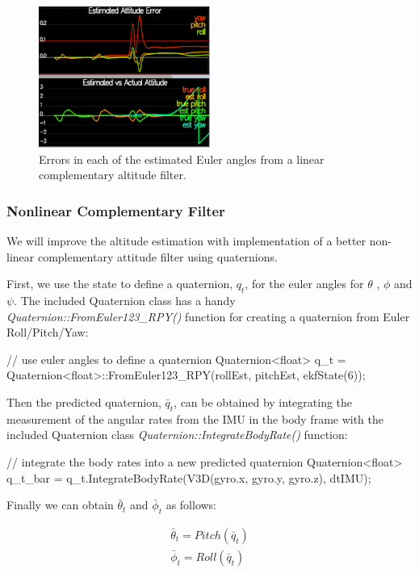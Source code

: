 \documentclass[letterpaper]{article}
\begin{document}
\begin{figure}[ht]
\centering
\includegraphics[width=0.5\textwidth]{./images/scenario7_1.png}
\caption{\label{fig:linear_comp_filter} Errors in each of the estimated Euler angles from a linear complementary altitude filter.}
\end{figure}

\subsubsection{Nonlinear Complementary Filter}

We will improve the altitude estimation with implementation of a better non-linear complementary attitude filter using quaternions.

First, we use the state to define a quaternion, $q_t$, for the euler angles for $\theta$ , $\phi$ and $\psi$.  The included Quaternion class has a handy \textit{Quaternion::FromEuler123\_RPY()} function for creating a quaternion from Euler Roll/Pitch/Yaw:

\begin{CPP}
// use euler angles to define a quaternion
Quaternion<float> q_t = Quaternion<float>::FromEuler123_RPY(rollEst, pitchEst, ekfState(6));
\end{CPP}

Then the predicted quaternion, $\bar{q}_t$, can be obtained by integrating the measurement of the angular rates from the IMU in the body frame with the included Quaternion class \textit{Quaternion::IntegrateBodyRate()} function:

\begin{CPP}
// integrate the body rates into a new predicted quaternion
Quaternion<float>  q_t_bar = q_t.IntegrateBodyRate(V3D(gyro.x, gyro.y, gyro.z), dtIMU);
\end{CPP}

Finally we can obtain $\bar{\theta}_t$ and $\bar{\phi}_t$ as follows:

\begin{align*}
  \bar{\theta}_t = Pitch(\bar{q}_t)\\
  \bar{\phi}_t = Roll(\bar{q}_t)
\end{align*}
\end{document}
